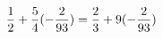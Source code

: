 \documentclass[preview]{standalone}
\begin{document}
\begin{align*}
\special{dvisvgm:raw <g id='unique000'>}\frac{1}{2} + \frac{5}{4} (- \frac{2}{93}) = \frac{2}{3} + 9(- \frac{2}{93})\special{dvisvgm:raw </g>}
\end{align*}
\end{document}
